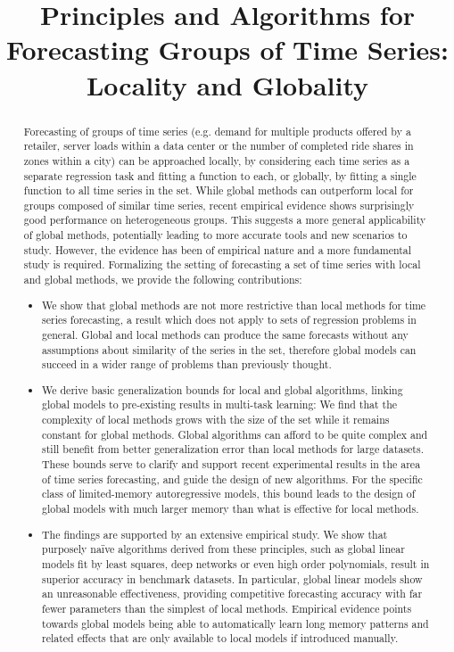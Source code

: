 \documentclass[a4paper]{article}
\title{Principles and Algorithms for Forecasting Groups of Time Series:
Locality and Globality
}
\author{
}
\theoremstyle{custom}
\begin{document}
\maketitle

\begin{abstract}


Forecasting of groups of time series (e.g. demand for multiple products offered by a retailer, server loads within a data center or the number of completed ride shares in zones within a city) can be approached locally, by considering each time series as a separate regression task and fitting a function to each, or globally,
by fitting a single function to all time series in the set.
While global methods can outperform local for groups composed of similar time series, recent empirical
evidence shows surprisingly good performance on heterogeneous groups.
This suggests a more general applicability of global methods, potentially leading to more accurate tools and new scenarios to study. However, the evidence has been of empirical nature and a more fundamental study is required.
Formalizing the setting of forecasting a set of time series with local and global methods, we provide the following contributions:

\begin{itemize}
\item We show that global methods are not more restrictive than local methods for time series forecasting, a result which does not apply to sets of regression problems in general.
Global and local methods can produce the same forecasts without any assumptions about similarity of the series in the set, therefore global models can succeed in a wider range of problems than previously thought.
\item We derive basic generalization bounds for local and global algorithms, linking global models to pre-existing results in multi-task learning: We find that the complexity of local methods grows with the size of the set while it remains constant for global methods. 
Global algorithms can afford to be quite complex and still benefit from better generalization error than local methods for large datasets.
These bounds serve to clarify and support recent experimental results in the area of time series forecasting, and guide the design of new algorithms.
For the specific class of limited-memory autoregressive models, this bound leads to the design of global models with much larger memory than what is effective for local methods.
\item The findings are supported by an extensive empirical study. We show that purposely naïve algorithms derived from these principles, such as global linear models fit by least squares, deep networks or even high order polynomials, result in superior accuracy in benchmark datasets.
In particular, global linear models show an unreasonable effectiveness, providing competitive forecasting accuracy with far fewer parameters than the simplest of local methods.
Empirical evidence points towards global models being able to automatically learn long memory patterns and related effects that are only available to local models if introduced manually.
\end{itemize}


\end{abstract}
\end{document}
